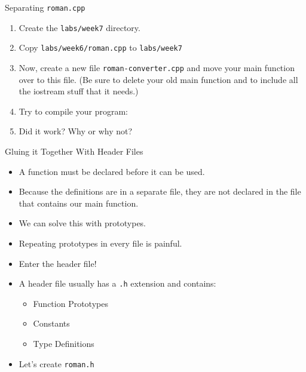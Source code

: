 \documentclass[]{beamer}
\begin{document}
\begin{frame}[fragile]{Separating \texttt{roman.cpp}}
    \begin{enumerate}[<+->]
        \item Create the \texttt{labs/week7} directory.
        \item Copy \texttt{labs/week6/roman.cpp} to
            \texttt{labs/week7}
        \item Now, create a new file \texttt{roman-converter.cpp} and 
            move your main function over to this file. (Be sure to
            delete your old main function and to include all the
            iostream stuff that it needs.)
        \item Try to compile your program:
        \item Did it work?  Why or why not?
    \end{enumerate}
\end{frame}

\begin{frame}{Gluing it Together With Header Files}
    \begin{itemize}[<+->]
        \item A function must be declared before it can be used.
        \item Because the definitions are in a separate file, they are
            not declared in the file that contains our main function.
        \item We can solve this with prototypes.
        \item Repeating prototypes in every file is painful.
        \item Enter the header file!  
        \item A header file usually has a \texttt{.h} extension and
            contains:
            \begin{itemize}
                \item Function Prototypes
                \item Constants
                \item Type Definitions
            \end{itemize}
        \item Let's create \texttt{roman.h}
    \end{itemize}
\end{frame}
\end{document}
